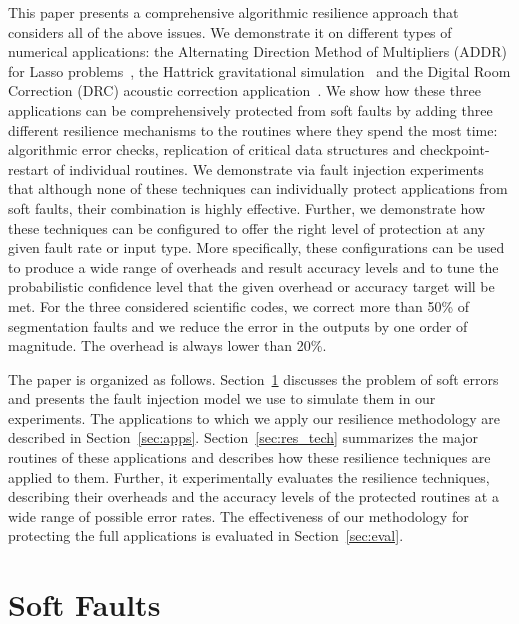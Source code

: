 \documentclass{sig-alternate}
\newcommand{\sui}[1]{%
  \textcolor{green}{SC - #1}
}
\newcommand{\greg}[1]{%
  \textcolor{blue}{GB: #1}
}
\begin{document}
This paper presents a comprehensive algorithmic resilience approach that considers all of the above issues.
We demonstrate it on different types of numerical applications: the Alternating Direction Method of Multipliers (ADDR) for Lasso problems~\cite{lasso:2011}, the Hattrick gravitational simulation~\cite{hattrick:2012} and the Digital Room Correction (DRC) acoustic correction application~\cite{drc:2012}.
We show how these three applications can be comprehensively protected from soft faults by adding three different resilience mechanisms to the routines where they spend the most time: algorithmic error checks, replication of critical data structures and checkpoint-restart of individual routines.
We demonstrate via fault injection experiments that although none of these techniques can individually protect applications from soft faults, their combination is highly effective.
Further, we demonstrate how these techniques can be configured to offer the right level of protection at any given fault rate or input type.
More specifically, these configurations can be used to produce a wide range of overheads and result accuracy levels and to tune the probabilistic confidence level that the given overhead or accuracy target will be met.
For the three considered scientific codes, we correct more than 50\% of segmentation faults and we reduce the error in the outputs by one order of magnitude. The overhead is always lower than 20\%.

The paper is organized as follows.
Section~\ref{sec:soft_faults} discusses the problem of soft errors and presents the fault injection model we use to simulate them in our experiments.
The applications to which we apply our resilience methodology are described in Section~\ref{sec:apps}.
Section~\ref{sec:res_tech} summarizes the major routines of these applications and describes how these resilience techniques are applied to them.
Further, it experimentally evaluates the resilience techniques, describing their overheads and the accuracy levels of the protected routines at a wide range of possible error rates.
The effectiveness of our methodology for protecting the full applications is evaluated in Section~\ref{sec:eval}.

\section{Soft Faults}
\label{sec:soft_faults}
\end{document}
